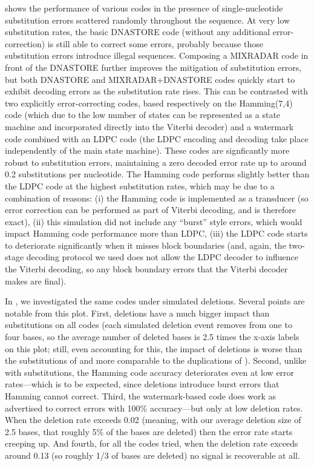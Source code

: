 \documentclass[english]{article}
\begin{document}
 shows the performance of various codes in the presence of single-nucleotide substitution errors
scattered randomly throughout the sequence.
At very low substitution rates, the basic DNASTORE code (without any additional error-correction)
is still able to correct some errors, probably because those substitution errors introduce illegal sequences.
Composing a MIXRADAR code in front of the DNASTORE further improves the mitigation of substitution errors,
but both DNASTORE and MIXRADAR+DNASTORE codes quickly start to exhibit decoding errors as the substitution rate rises.
This can be contrasted with two explicitly error-correcting codes, based respectively on the Hamming(7,4) code
(which due to the low number of states can be represented as a state machine and incorporated directly into the
Viterbi decoder)
and a watermark code combined with an LDPC code
(the LDPC encoding and decoding take place independently of the main state machine).
These codes are signficantly more robust to substitution errors, maintaining a zero decoded error rate
up to around 0.2 substitutions per nucleotide.
The Hamming code performs slightly better than the LDPC code at the highest substitution rates,
which may be due to a combination of reasons:
(i) the Hamming code is implemented as a transducer (so error correction can be performed
as part of Viterbi decoding, and is therefore exact),
(ii) this simulation did not include any
``burst'' style errors, which would impact Hamming code performance more than LDPC,
(iii) the LDPC code starts to deteriorate significantly when it misses block boundaries
(and, again, the two-stage decoding protocol we used does not allow the LDPC decoder to influence the
Viterbi decoding, so any block boundary errors that the Viterbi decoder makes are final).

In , we investigated the same codes under simulated deletions.
Several points are notable from this plot.
First, deletions have a much bigger impact than substitutions on all codes
(each simulated deletion event removes from one to four bases, so the average number of deleted bases
is 2.5 times the x-axis labels on this plot; still, even accounting for this, the impact of deletions
is worse than the substitutions of  and more comparable to the duplications of ).
Second, unlike with substitutions, the Hamming code accuracy deteriorates even at low error rates---which
is to be expected, since deletions introduce burst errors that Hamming cannot correct.
Third, the watermark-based code does work as advertised to correct errors with 100\% accuracy---but
only at low deletion rates.
When the deletion rate exceeds 0.02 (meaning, with our average deletion size of 2.5 bases, that roughly
5\% of the bases are deleted) then the error rate starts creeping up.
And fourth, for all the codes tried, when the deletion rate exceeds around 0.13 (so roughly 1/3 of bases are deleted)
no signal is recoverable at all.
\end{document}
